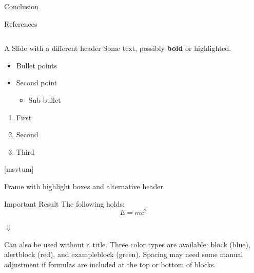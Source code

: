 \documentclass[10pt,t]{beamer}
\begin{document}
\begin{frame}{Conclusion}
\end{frame}

\begin{frame}[allowframebreaks]{References}
    \begin{columns}
        \column{0.80\paperwidth}
        \printbibliography
    \end{columns}
\end{frame}

{
    \begin{frame}{A Slide with a different header}
        Some text, possibly \textbf{bold} or \alert{highlighted}.

        \begin{itemize}
            \item Bullet points
            \item Second point
                \begin{itemize}
                    \item Sub-bullet
                \end{itemize}
        \end{itemize}

        \pause
        \begin{enumerate}
            \item First
            \item Second
            \item Third
        \end{enumerate}

    \end{frame}
}

{\lowertitle\lowertitle
{}[msvtum]
\begin{frame}{Frame with highlight boxes and alternative header}

    \begin{block}{Important Result\footnotemark[1]}
        The following holds:\footnotemark[2]
        \begin{equation*}
            E = mc^2
        \end{equation*}
    \end{block}

    \pause

    \begin{center}
        $\Downarrow$
    \end{center}

    \begin{alertblock}{}
        Can also be used without a title.
        Three color types are available: block (blue), alertblock (red), and exampleblock (green).
        Spacing may need some manual adjustment if formulas are included at the top or bottom of blocks.
    \end{alertblock}

\end{frame}
}
\end{document}
